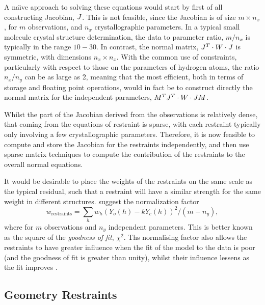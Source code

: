 \documentclass[pdf]{iucr}
\begin{document}
A na\"{\i}ve approach to solving these equations would start by first of all constructing Jacobian, $J$. This is not feasible, since the Jacobian is of size $m \times n_x$, for $m$ observations, and $n_x$ crystallographic parameters. In a typical small molecule crystal structure determination, the data to parameter ratio, $m / n_x$ is typically in the range $10-30$. In contrast, the normal matrix, $J^T \cdot W \cdot J$ is symmetric, with dimensions $n_x \times n_x$. With the common use of constraints, particularly with respect to those on the parameters of hydrogen atoms, the ratio $n_x/n_y$ can be as large as 2, meaning that the most efficient, both in terms of storage and floating point operations, would in fact be to construct directly the normal matrix for the independent parameters, $M^T J^T \cdot W \cdot J M$.

Whilst the part of the Jacobian derived from the observations is relatively dense, that coming from the equations of restraint is sparse, with each restraint typically
only involving a few crystallographic parameters. Therefore, it is now feasible to compute and store the Jacobian for the restraints independently, and then use sparse matrix techniques to compute the contribution of the restraints to the overall normal equations.

It would be desirable to place the weights of the restraints on the same scale as the typical residual, such that a restraint will have a similar strength for the same weight in different structures. \cite{Giacovazzo:2002} suggest the normalization factor
\begin{equation}
w_\text{restraints} = \sum_{h}{ w_h (Y_o(h) - k Y_c(h))^2} / \left(m - n_y \right)
\label{eqn:giacovazzo_normalisation},
\end{equation}
where for $m$ observations and $n_y$ independent parameters. This is better known as the square of the \emph{goodness of fit}, $\chi^2$. Ths normalising factor also allows the restraints to have greater influence when the fit of the model to the data is poor (and the goodness of fit is greater than unity), whilst their influence lessens as the fit improves \cite{SHELX:man97}.


\subsection{Geometry Restraints}
\end{document}
